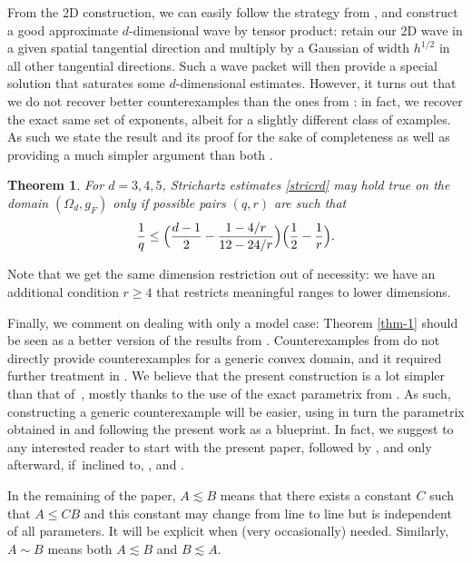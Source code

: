 \documentclass[11pt]{article}
\theoremstyle{plain}
\newtheorem{thm}{Theorem}
\theoremstyle{definition}
\begin{document}
From the 2D construction, we can easily follow the strategy from \cite{doi2}, and construct a good approximate $d$-dimensional wave by tensor product: retain our 2D wave in a given spatial tangential direction and multiply by a Gaussian of width $h^{1/2}$ in all other tangential directions. Such a wave packet will then provide a special solution that saturates some $d$-dimensional estimates. However, it turns out that we do not recover better counterexamples than the ones from \cite{doi2}: in fact, we recover the exact same set of exponents, albeit for a slightly different class of examples. As such we state the result and its proof for the sake of completeness as well as providing a much simpler argument than both \cite{doi,doi2}.
\begin{thm}
\label{thm-2}
For $d=3,4,5$, Strichartz estimates \eqref{stricrd} may hold true on the domain $(\Omega_{d},g_{F})$ only if possible pairs $(q,r)$ are
such that
\begin{equation*}\label{adm-1/10d}
\frac 1q\leq \Bigl(\frac{d-1} 2 -\frac {1-4/r}{12-24/r}\Bigr)\Bigl(\frac{1}{2}-\frac{1}{r}\Bigr).
\end{equation*}
\end{thm}
Note that we get the same dimension restriction out of necessity: we have an additional condition $r\geq 4$ that restricts meaningful ranges to lower dimensions.

Finally, we comment on dealing with only a model case: Theorem \ref{thm-1} should be seen as a better version of the results from \cite{doi}. Counterexamples from \cite{doi} do not directly provide counterexamples for a generic convex domain, and it required further treatment in \cite{doi2}. We believe that the present construction is a lot simpler than that of~\cite{doi}, mostly thanks to the use of the exact parametrix from \cite{ILP3}. As such, constructing a generic counterexample will be easier, using in turn the parametrix obtained in \cite{ILLP} and following the present work as a blueprint. In fact, we suggest to any interested reader to start with the present paper, followed by \cite{ILP3}, \cite{ILLP} and only afterward, if~inclined to, \cite{doi}, \cite{doi2} and \cite{Annals}.

In the remaining of the paper, $A\lesssim B$ means that there exists a constant $C$ such that $A\leq CB$ and this constant may change from line to line but is independent of all parameters. It will be explicit when (very occasionally) needed. Similarly, $A\sim B$ means both $A\lesssim B$ and $B\lesssim A$.
\end{document}
